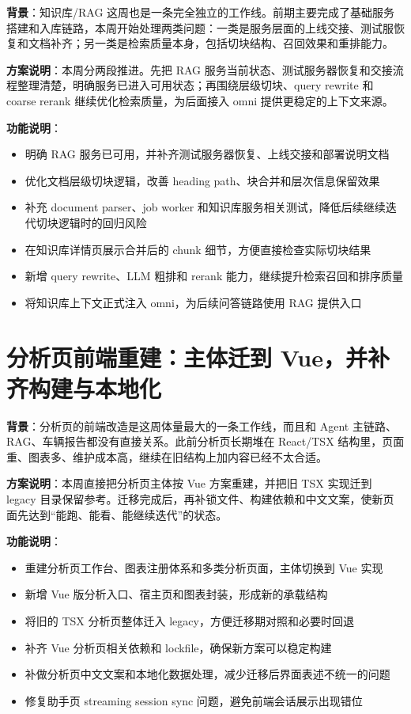 \documentclass[UTF8]{ctexart}
\begin{document}
\textbf{背景}：知识库/RAG 这周也是一条完全独立的工作线。前期主要完成了基础服务搭建和入库链路，本周开始处理两类问题：一类是服务层面的上线交接、测试服恢复和文档补齐；另一类是检索质量本身，包括切块结构、召回效果和重排能力。

\textbf{方案说明}：本周分两段推进。先把 RAG 服务当前状态、测试服务器恢复和交接流程整理清楚，明确服务已进入可用状态；再围绕层级切块、query rewrite 和 coarse rerank 继续优化检索质量，为后面接入 omni 提供更稳定的上下文来源。

\textbf{功能说明}：
\begin{itemize}
\item 明确 RAG 服务已可用，并补齐测试服务器恢复、上线交接和部署说明文档
\item 优化文档层级切块逻辑，改善 heading path、块合并和层次信息保留效果
\item 补充 document parser、job worker 和知识库服务相关测试，降低后续继续迭代切块逻辑时的回归风险
\item 在知识库详情页展示合并后的 chunk 细节，方便直接检查实际切块结果
\item 新增 query rewrite、LLM 粗排和 rerank 能力，继续提升检索召回和排序质量
\item 将知识库上下文正式注入 omni，为后续问答链路使用 RAG 提供入口
\end{itemize}

\section{分析页前端重建：主体迁到 Vue，并补齐构建与本地化}

\textbf{背景}：分析页的前端改造是这周体量最大的一条工作线，而且和 Agent 主链路、RAG、车辆报告都没有直接关系。此前分析页长期堆在 React/TSX 结构里，页面重、图表多、维护成本高，继续在旧结构上加内容已经不太合适。

\textbf{方案说明}：本周直接把分析页主体按 Vue 方案重建，并把旧 TSX 实现迁到 legacy 目录保留参考。迁移完成后，再补锁文件、构建依赖和中文文案，使新页面先达到“能跑、能看、能继续迭代”的状态。

\textbf{功能说明}：
\begin{itemize}
\item 重建分析页工作台、图表注册体系和多类分析页面，主体切换到 Vue 实现
\item 新增 Vue 版分析入口、宿主页和图表封装，形成新的承载结构
\item 将旧的 TSX 分析页整体迁入 legacy，方便迁移期对照和必要时回退
\item 补齐 Vue 分析页相关依赖和 lockfile，确保新方案可以稳定构建
\item 补做分析页中文文案和本地化数据处理，减少迁移后界面表述不统一的问题
\item 修复助手页 streaming session sync 问题，避免前端会话展示出现错位
\end{itemize}
\end{document}
